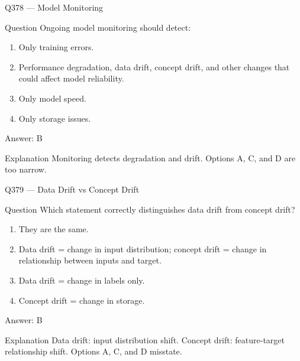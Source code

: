 \documentclass[aspectratio=169,8pt]{beamer}
\begin{document}
	\begin{frame}{Q378 --- Model Monitoring}
		\begin{block}{Question}
			Ongoing model monitoring should detect:
			\begin{enumerate}
				\item Only training errors.
				\item Performance degradation, data drift, concept drift, and other changes that could affect model reliability.
				\item Only model speed.
				\item Only storage issues.
			\end{enumerate}
		\end{block}
		\begin{exampleblock}{Answer: B}\end{exampleblock}
		\begin{block}{Explanation}
			Monitoring detects degradation and drift. Options A, C, and D are too narrow.
		\end{block}
	\end{frame}
	
	\begin{frame}{Q379 --- Data Drift vs Concept Drift}
		\begin{block}{Question}
			Which statement correctly distinguishes data drift from concept drift?
			\begin{enumerate}
				\item They are the same.
				\item Data drift = change in input distribution; concept drift = change in relationship between inputs and target.
				\item Data drift = change in labels only.
				\item Concept drift = change in storage.
			\end{enumerate}
		\end{block}
		\begin{exampleblock}{Answer: B}\end{exampleblock}
		\begin{block}{Explanation}
			Data drift: input distribution shift. Concept drift: feature-target relationship shift. Options A, C, and D misstate.
		\end{block}
	\end{frame}
	
\end{document}
